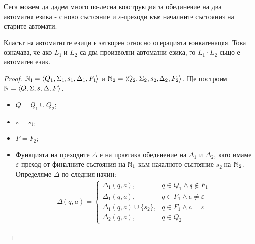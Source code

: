 Сега можем да дадем много по-лесна конструкция за обединение на два автоматни езика
- с ново състояние и $\varepsilon$-преходи към началните състояния на старите
автомати.

\begin{lemma}
  Класът на автоматните езици е затворен относно операцията конкатенация.
  Това означава, че ако $L_1$ и $L_2$ са два произволни автоматни езика, то $L_1\cdot L_2$
  също е автоматен език.
\end{lemma}
\begin{proof}
  $\mathbb{N}_1 = \langle{Q_1,\Sigma_1,s_1,\Delta_1,F_1}\rangle$ и $\mathbb{N}_2 = \langle{Q_2,\Sigma_2,s_2,\Delta_2,F_2}\rangle$.
  Ще построим $\mathbb{N} = \langle{Q,\Sigma,s,\Delta,F}\rangle$.
  \begin{itemize}
  \item
    $Q = Q_1\cup Q_2$;
  \item
    $s = s_1$;
  \item
    $F = F_2$;
  \item
    Функцията на преходите $\Delta$ е на практика обединение на $\Delta_1$ и $\Delta_2$,
    като имаме $\varepsilon$-преход от финалните състояния на $\mathbb{N}_1$ към началното състояние $s_2$ на $\mathbb{N}_2$.
    Определяме $\Delta$ по следния начин:
    \begin{eqnarray*}
      \Delta(q,a) = 
      \begin{cases}
        \Delta_1(q,a), & q\in Q_1\wedge q\not\in F_1\\
        \Delta_1(q,a), & q\in F_1\wedge a \neq \varepsilon\\
        \Delta_1(q,a)\cup\{s_2\}, & q\in F_1\wedge a = \varepsilon\\
        \Delta_2(q,a), & q\in Q_2
      \end{cases}
    \end{eqnarray*}
  \end{itemize}
\end{proof}

